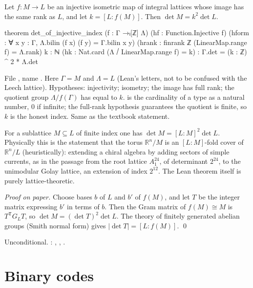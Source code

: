 \begin{theorem}\label{ch02:thm:index}
Let $f:M\to L$ be an injective isometric map of integral lattices whose image has the same rank
as $L$, and let $k=[L:f(M)]$.  Then $\det M=k^2\det L$.
\end{theorem}
\begin{leancode}
theorem det_of_injective_index (f : Γ →ₗ[ℤ] Λ) (hf : Function.Injective f)
    (hform : ∀ x y : Γ, Λ.bilin (f x) (f y) = Γ.bilin x y)
    (hrank : finrank ℤ (LinearMap.range f) = Λ.rank)
    {k : ℕ} (hk : Nat.card (Λ ⧸ LinearMap.range f) = k) :
    Γ.det = (k : ℤ) ^ 2 * Λ.det
\end{leancode}
\begin{dictionary}
File , name .
Here $\Gamma=M$ and $\Lambda=L$ (Lean's letters, not to be confused with the Leech lattice).
Hypotheses:  injectivity;  isometry;  the image has full rank;
 the quotient group $\Lambda/f(\Gamma)$ has  equal to $k$.
 is the cardinality of a type as a natural number, $0$ if infinite; the full-rank
hypothesis guarantees the quotient is finite, so $k$ is the honest index.  Same as the textbook
statement.
\end{dictionary}
\begin{physics}
For a sublattice $M\subseteq L$ of finite index one has $\det M=[L:M]^2\det L$. Physically this is the statement that the torus $\mathbb{R}^n/M$ is an $[L:M]$-fold cover of $\mathbb{R}^n/L$ (heuristically): extending a chiral algebra by adding sectors of simple currents, as in the passage from the root lattice $A_1^{24}$, of determinant $2^{24}$, to the unimodular Golay lattice, an extension of index $2^{12}$. The Lean theorem itself is purely lattice-theoretic.
\end{physics}
\emph{Proof on paper.}  Choose bases $b$ of $L$ and $b'$ of $f(M)$, and let $T$ be the integer
matrix expressing $b'$ in terms of $b$.  Then the Gram matrix of $f(M)\cong M$ is $T^{\mathsf
T}G_LT$, so $\det M=(\det T)^2\det L$.  The theory of finitely generated abelian groups (Smith
normal form) gives $|\det T|=[L:f(M)]$.  \qed
\begin{status}
Unconditional.  : ,
, .
\end{status}

\section{Binary codes}\label{ch02:sec:codes}

